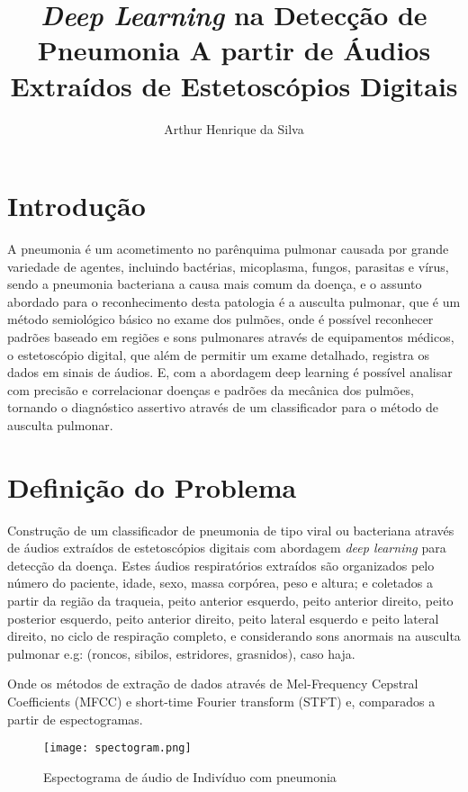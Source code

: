 \documentclass[letterpaper, 10 pt, conference]{ieeeconf}  %
\title{\LARGE \bf
\textit{Deep Learning} na Detecção de Pneumonia A partir de Áudios Extraídos de Estetoscópios Digitais
}
\author{Arthur Henrique da Silva}
\begin{document}



\maketitle
\thispagestyle{empty}
\pagestyle{empty}


\section{Introdução}

A pneumonia é um acometimento no parênquima pulmonar causada por grande variedade de agentes, incluindo bactérias, micoplasma, fungos, parasitas e
vírus, sendo a pneumonia bacteriana a causa mais comum da doença, e o assunto abordado para o reconhecimento desta patologia é a ausculta pulmonar, que é um método semiológico básico no exame dos pulmões, onde é possível reconhecer padrões baseado em regiões e sons pulmonares através de equipamentos médicos, o estetoscópio digital, que além de permitir um exame detalhado, registra os dados em sinais de áudios. E, com a abordagem deep learning é possível analisar com precisão e correlacionar doenças e padrões da mecânica dos pulmões, tornando o diagnóstico assertivo através de um classificador para o método de ausculta pulmonar.


\section{Definição do Problema}

Construção de um classificador de pneumonia de tipo viral ou bacteriana através de áudios extraídos de estetoscópios digitais com abordagem 
\textit{deep learning} para detecção da doença. Estes áudios respiratórios extraídos são organizados pelo número do paciente, idade, sexo, massa corpórea, peso e altura; e coletados a partir da região da traqueia, peito anterior esquerdo, peito anterior direito, peito posterior esquerdo, peito anterior direito, peito lateral esquerdo e peito lateral direito, no ciclo de respiração completo, e considerando sons anormais na ausculta pulmonar e.g: (roncos, sibilos, estridores, grasnidos), caso haja.

Onde os métodos de extração de dados através de Mel-Frequency Cepstral Coefficients (MFCC) e short-time Fourier transform (STFT) e, comparados a partir de espectogramas.

\begin{figure}[htp]
    \centering
    \texttt{[image: spectogram.png]}
    \caption{Espectograma de áudio de Indivíduo com pneumonia}
    \label{fig:galaxy}
\end{figure}
\end{document}
